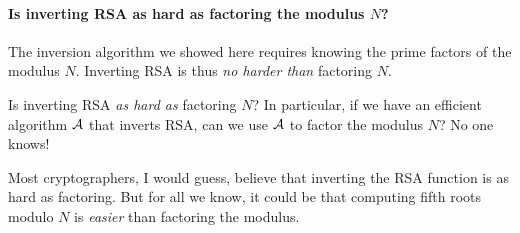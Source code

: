 \paragraph{Is inverting RSA as hard as factoring the modulus $N$?}
The inversion algorithm we showed here requires knowing the prime factors
of the modulus $N$.
Inverting RSA is thus \emph{no harder than} factoring $N$.

Is inverting RSA \emph{as hard as} factoring $N$?
In particular, if we have an efficient algorithm $\mathcal{A}$ that inverts
RSA, can we use $\mathcal{A}$ to factor the modulus $N$?
No one knows!

Most cryptographers, I would guess, believe that inverting the RSA function
is as hard as factoring.
But for all we know, it could be that computing fifth roots modulo $N$ is \emph{easier}
than factoring the modulus.


